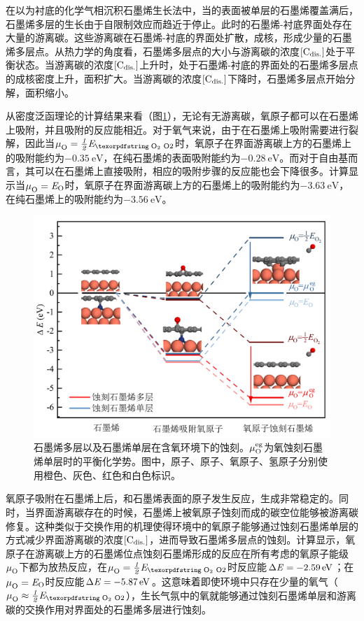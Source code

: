 在以为衬底的化学气相沉积石墨烯生长法中，当的表面被单层的石墨烯覆盖满后，石墨烯多层的生长由于自限制效应而趋近于停止。此时的石墨烯-衬底界面处存在大量的游离碳。这些游离碳在石墨烯-衬底的界面处扩散，成核，形成少量的石墨烯多层点。从热力学的角度看，石墨烯多层点的大小与游离碳的浓度$\rm{\left[C_{dis.}\right]} \it$处于平衡状态。当游离碳的浓度$\rm{\left[C_{dis.}\right]} \it$上升时，处于石墨烯-衬底的界面处的石墨烯多层点的成核密度上升，面积扩大。当游离碳的浓度$\rm{\left[C_{dis.}\right]} \it$下降时，石墨烯多层点开始分解，面积缩小。

从密度泛函理论的计算结果来看（图\ref{fig:FLG_DFT_Oetch}），无论有无游离碳，氧原子都可以在石墨烯上吸附，并且吸附的反应能相近。对于氧气来说，由于在石墨烯上吸附需要进行裂解，因此当$\muO{}=\halfEOm$时，氧原子在界面游离碳上方的石墨烯上的吸附能约为$\SI{-0.35}{\electronvolt}$，在纯石墨烯的表面吸附能约为$\SI{-0.28}{\electronvolt}$。而对于自由基而言，其可以在石墨烯上直接吸附，相应的吸附步骤的反应能也会下降很多。计算显示当$\it \mu_{\rm O}^{\rm } \it=\it E_{\rm O} \it$时，氧原子在界面游离碳上方的石墨烯上的吸附能约为$\SI{-3.63}{\electronvolt}$，在纯石墨烯上的吸附能约为$\SI{-3.56}{\electronvolt}$。

\begin{figure}[htb]
    \includegraphics{pic/FLG_DFT_Oetch.png}
    \caption{石墨烯多层以及石墨烯单层在含氧环境下的蚀刻。$\it \mu_{\rm O}^{\rm eg} \it$为氧蚀刻石墨烯单层时的平衡化学势。图中，原子、原子、氧原子、氢原子分别使用橙色、灰色、红色和白色标识。}
    \label{fig:FLG_DFT_Oetch}
\end{figure}

氧原子吸附在石墨烯上后，和石墨烯表面的原子发生反应，生成非常稳定的。同时，当界面游离碳存在的时候，石墨烯上被氧原子蚀刻而成的碳空位能够被游离碳修复。这种类似于交换作用的机理使得环境中的氧原子能够通过蚀刻石墨烯单层的方式减少界面游离碳的浓度$\rm{\left[C_{dis.}\right]} \it$，进而导致石墨烯多层点的蚀刻。计算显示，氧原子在游离碳上方的石墨烯位点蚀刻石墨烯形成的反应在所有考虑的氧原子能级$\it \mu_{\rm O}^{\rm } \it$下都为放热反应，在$\muO{}=\halfEOm$时反应能$\rm{\Delta} \it E=\SI{-2.59}{\electronvolt}$；在$\it \mu_{\rm O}^{\rm } \it=\it E_{\rm O} \it$时反应能$\rm{\Delta} \it E=\SI{-5.87}{\electronvolt}$。这意味着即使环境中只存在少量的氧气（$\muO{} \approx \halfEOm$），生长气氛中的氧就能够通过蚀刻石墨烯单层和游离碳的交换作用对界面处的石墨烯多层进行蚀刻。

